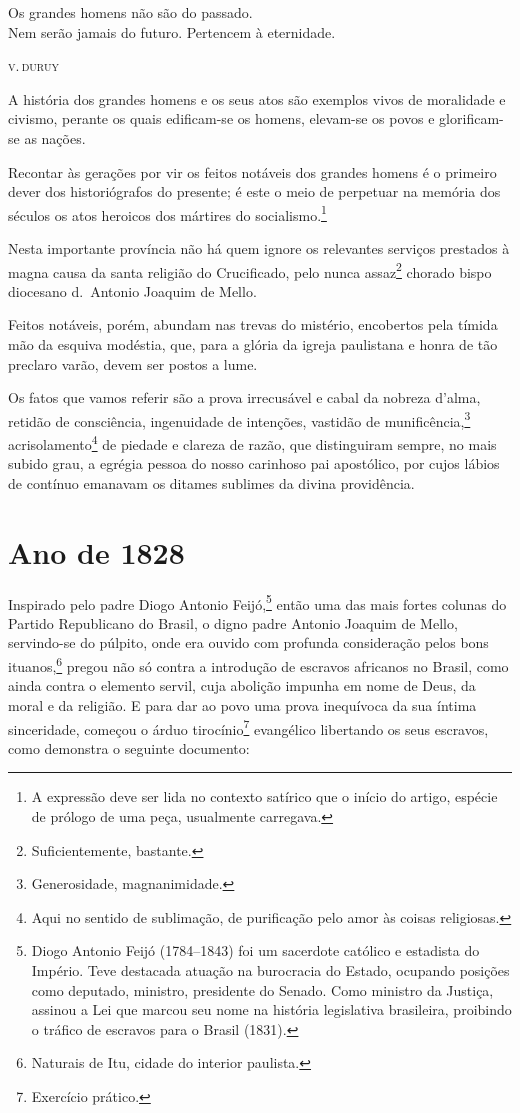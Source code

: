 \epigraph{Os grandes homens não são do passado.\\
Nem serão jamais do futuro. Pertencem à eternidade.}{\textsc{v.\,duruy}\footnotemark}


A história dos grandes homens e os seus atos são exemplos vivos de
moralidade e civismo, perante os quais edificam-se os homens, elevam-se
os povos e glorificam-se as nações.

Recontar às gerações por vir os feitos notáveis dos grandes homens é o
primeiro dever dos historiógrafos do presente; é este o meio de
perpetuar na memória dos séculos os atos heroicos dos mártires do
socialismo.\footnote{A expressão deve ser lida no contexto satírico
  que o início do artigo, espécie de prólogo de uma peça, usualmente
  carregava.}

Nesta importante província não há quem ignore os relevantes serviços
prestados à magna causa da santa religião do Crucificado, pelo nunca
assaz\footnote{Suficientemente, bastante.} chorado bispo diocesano
d.~Antonio Joaquim de Mello.

Feitos notáveis, porém, abundam nas trevas do mistério, encobertos pela
tímida mão da esquiva modéstia, que, para a glória da igreja paulistana
e honra de tão preclaro varão, devem ser postos a lume.

Os fatos que vamos referir são a prova irrecusável e cabal da nobreza
d'alma, retidão de consciência, ingenuidade de intenções, vastidão de
munificência,\footnote{Generosidade, magnanimidade.}
acrisolamento\footnote{Aqui no sentido de sublimação, de purificação
  pelo amor às coisas religiosas.} de piedade e clareza de razão, que
distinguiram sempre, no mais subido grau, a egrégia pessoa do nosso
carinhoso pai apostólico, por cujos lábios de contínuo emanavam os
ditames sublimes da divina providência.

\section{Ano de 1828}

Inspirado pelo padre Diogo Antonio Feijó,\footnote{Diogo Antonio Feijó
  (1784--1843) foi um sacerdote católico e estadista do Império. Teve
  destacada atuação na burocracia do Estado, ocupando posições como
  deputado, ministro, presidente do Senado. Como ministro da Justiça,
  assinou a Lei que marcou seu nome na história legislativa brasileira,
  proibindo o tráfico de escravos para o Brasil (1831).} então uma das
mais fortes colunas do Partido Republicano do Brasil, o digno padre
Antonio Joaquim de Mello, servindo-se do púlpito, onde era ouvido com
profunda consideração pelos bons ituanos,\footnote{Naturais de Itu,
  cidade do interior paulista.} pregou não só contra a introdução de
escravos africanos no Brasil, como ainda contra o elemento servil, cuja
abolição impunha em nome de Deus, da moral e da religião. E para dar ao
povo uma prova inequívoca da sua íntima sinceridade, começou o árduo
tirocínio\footnote{Exercício prático.} evangélico libertando os seus
escravos, como demonstra o seguinte documento:


